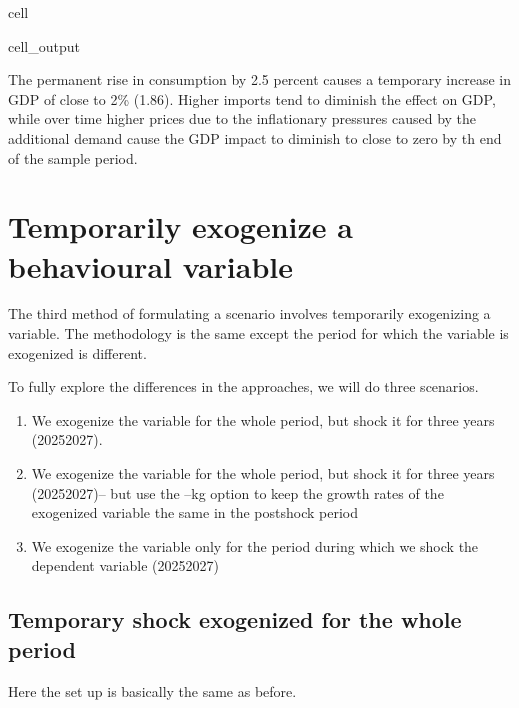 \documentclass[letterpaper,10pt,english]{jupyterBook}
\begin{document}
\begin{sphinxuseclass}{cell}
\begin{sphinxVerbatimOutput}
\begin{sphinxuseclass}{cell_output}
\end{sphinxuseclass}\end{sphinxVerbatimOutput}

\end{sphinxuseclass}
\sphinxAtStartPar
The permanent rise in consumption by 2.5 percent causes a temporary increase in GDP of close to 2\% (1.86). Higher imports tend to diminish the effect on GDP, while over time higher prices due to the inflationary pressures caused by the additional demand cause the GDP impact to diminish to close to zero by th end of the sample period.


\section{Temporarily exogenize a behavioural variable}
\label{\detokenize{content/06_WBModels/LoadingWBModel:temporarily-exogenize-a-behavioural-variable}}
\sphinxAtStartPar
The third method of formulating a scenario involves temporarily exogenizing a variable.    The methodology is the same except the period for which the variable is exogenized is different.

\sphinxAtStartPar
To fully explore the differences in the approaches, we will do three scenarios.
\begin{enumerate}
%
\item {} 
\sphinxAtStartPar
We exogenize the variable for the whole period, but shock it for three years (2025\sphinxhyphen{}2027).

\item {} 
\sphinxAtStartPar
We exogenize the variable for the whole period, but shock it for three years (2025\sphinxhyphen{}2027)– but use the –kg option to keep the growth rates of the exogenized variable the same in the post\sphinxhyphen{}shock period

\item {} 
\sphinxAtStartPar
We exogenize the variable only for the period during which we shock the dependent variable (2025\sphinxhyphen{}2027)

\end{enumerate}


\subsection{Temporary shock exogenized for the whole period}
\label{\detokenize{content/06_WBModels/LoadingWBModel:temporary-shock-exogenized-for-the-whole-period}}
\sphinxAtStartPar
Here the set up is basically the same as before.
\end{document}
